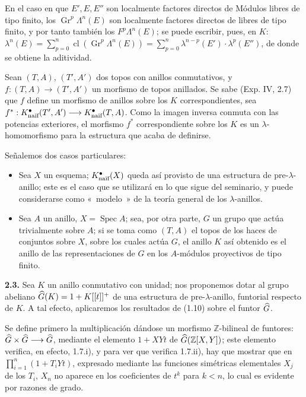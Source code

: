 En el caso en que \(E',E,E''\) son localmente factores directos de Módulos libres de tipo finito, los \(\operatorname{Gr}^p\Lambda^n(E)\) son localmente factores directos de libres de tipo finito, y por tanto también los \(F^p\Lambda^n(E)\); se puede escribir, pues, en \(K\):
\(\lambda^n(E)=\sum_{p=0}^{n}\operatorname{cl}(\operatorname{Gr}^p\Lambda^n(E))=\sum_{p=0}^{n}\lambda^{n-p}(E')\cdot\lambda^p(E'')\), de donde se obtiene la aditividad.

Sean \((T,A)\), \((T',A')\) dos topos con anillos conmutativos, y \(f:(T,A)\longrightarrow(T',A')\) un morfismo de topos anillados. Se sabe (Exp. IV, 2.7) que \(f\) define un morfismo de anillos sobre los \(K\) correspondientes, sea \(f^*:K^{\bullet}_{\naif}(T',A')\longrightarrow K^{\bullet}_{\naif}(T,A)\). Como la imagen inversa conmuta con las potencias exteriores, el morfismo \(f^*\) correspondiente sobre los \(K\) es un \(\lambda\)-homomorfismo para la estructura que acaba de definirse.

Señalemos dos casos particulares:
\begin{itemize}
\item Sea \(X\) un esquema; \(K^{\bullet}_{\naif}(X)\) queda así provisto de una estructura de pre-\(\lambda\)-anillo; este es el caso que se utilizará en lo que sigue del seminario, y puede considerarse como «~modelo~» de la teoría general de los \(\lambda\)-anillos.
\item Sea \(A\) un anillo, \(X=\operatorname{Spec}A\); sea, por otra parte, \(G\) un grupo que actúa trivialmente sobre \(A\); si se toma como \((T,A)\) el topos de los haces de conjuntos sobre \(X\), sobre los cuales actúa \(G\), el anillo \(K\) así obtenido es el anillo de las representaciones de \(G\) en los \(A\)-módulos proyectivos de tipo finito.
\end{itemize}

\textbf{2.3.} Sea \(K\) un anillo conmutativo con unidad; nos proponemos dotar al grupo abeliano \(\Ghat(K)=1+K[[t]]^+\) de una estructura de pre-\(\lambda\)-anillo, funtorial respecto de \(K\). A tal efecto, aplicaremos los resultados de (1.10) sobre el funtor \(\Ghat\).

Se define primero la multiplicación dándose un morfismo \(\mathbb Z\)-bilineal de funtores: \(\Ghat\times\Ghat\longrightarrow\Ghat\), mediante el elemento \(1+XYt\) de \(\Ghat(\mathbb Z[X,Y])\); este elemento verifica, en efecto, 1.7.i), y para ver que verifica 1.7.ii), hay que mostrar que en \(\prod_{i=1}^{n}(1+T_iYt)\), expresado mediante las funciones simétricas elementales \(X_j\) de los \(T_i\), \(X_n\) no aparece en los coeficientes de \(t^k\) para \(k<n\), lo cual es evidente por razones de grado.

